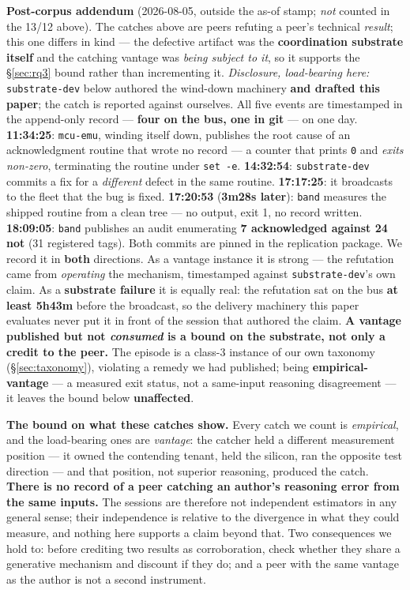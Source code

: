 \documentclass[10pt,conference]{IEEEtran}   %
\begin{document}
\textbf{Post-corpus addendum} (2026-08-05, outside the as-of stamp; \emph{not} counted in the
13/12 above). The catches above are peers refuting a peer's technical \emph{result}; this one
differs in kind --- the defective artifact was the \textbf{coordination substrate itself} and the
catching vantage was \emph{being subject to it}, so it supports the \S\ref{sec:rq3} bound rather than
incrementing it. \emph{Disclosure, load-bearing here:} \texttt{substrate-dev} below authored the
wind-down machinery \textbf{and drafted this paper}; the catch is reported against ourselves.
All five events are timestamped in the append-only record --- \textbf{four on the bus, one in git}
--- on one day. \textbf{11:34:25}: \texttt{mcu-emu}, winding itself down, publishes the root cause
of an acknowledgment routine that wrote no record --- a counter that prints \texttt{0} and
\emph{exits non-zero}, terminating the routine under \texttt{set -e}. \textbf{14:32:54}:
\texttt{substrate-dev} commits a fix for a \emph{different} defect in the same routine.
\textbf{17:17:25}: it broadcasts to the fleet that the bug is fixed. \textbf{17:20:53}
(\textbf{3m28s later}): \texttt{band} measures the shipped routine from a clean tree --- no
output, exit 1, no record written. \textbf{18:09:05}: \texttt{band} publishes an audit enumerating
\textbf{7 acknowledged against 24 not} (31 registered tags). Both commits are pinned in the
replication package.
We record it in \textbf{both} directions. As a vantage instance it is strong --- the refutation came
from \emph{operating} the mechanism, timestamped against \texttt{substrate-dev}'s own claim. As a
\textbf{substrate failure} it is equally real: the refutation sat on the bus \textbf{at least
5h43m} before the broadcast, so the delivery machinery this paper evaluates never put it in front
of the session that authored the claim. \textbf{A vantage published but not \emph{consumed} is a
bound on the substrate, not only a credit to the peer.} The episode is a class-3 instance of our own taxonomy
(\S\ref{sec:taxonomy}), violating a remedy we had published; being \textbf{empirical-vantage} --- a measured
exit status, not a same-input reasoning disagreement --- it leaves the bound below
\textbf{unaffected}.

\textbf{The bound on what these catches show.} Every catch we count is
\emph{empirical}, and the load-bearing ones are \emph{vantage}: the catcher held a different
measurement position --- it owned the
contending tenant, held the silicon, ran the opposite test direction --- and that position, not
superior reasoning, produced the catch. \textbf{There is no record of a peer catching an author's
reasoning error from the same inputs.} The sessions are therefore not independent estimators in any
general sense; their independence is relative to the divergence in what they could measure, and
nothing here supports a claim beyond that. Two consequences we hold to: before crediting two
results as corroboration, check whether they share a generative mechanism and discount if they do;
and a peer with the same vantage as the author is not a second instrument.
\end{document}
